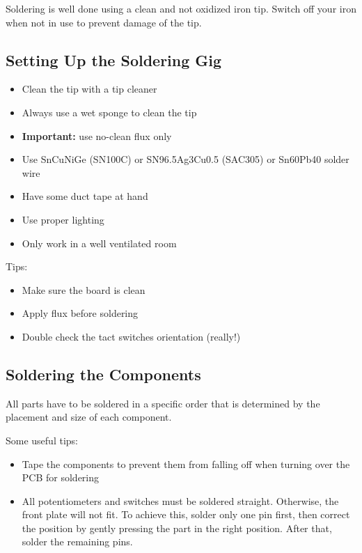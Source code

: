 \documentclass{scrartcl}
\begin{document}
Soldering is well done using a clean and not oxidized iron tip. Switch off your iron when not in use to prevent damage of the tip.

\subsection{Setting Up the Soldering Gig}

\begin{itemize}
    \item Clean the tip with a tip cleaner
    \item Always use a wet sponge to clean the tip
    \item \textbf{Important:} use no-clean flux only
    \item Use SnCuNiGe (SN100C) or SN96.5Ag3Cu0.5 (SAC305) or Sn60Pb40 solder wire
    \item Have some duct tape at hand
    \item Use proper lighting
    \item Only work in a well ventilated room
\end{itemize}

Tips:

\begin{itemize}
    \item Make sure the board is clean
    \item Apply flux before soldering
    \item Double check the tact switches orientation (really!)
\end{itemize}

\subsection{Soldering the Components}

All parts have to be soldered in a specific order that is determined by the placement and size of each component.

Some useful tips:

\begin{itemize}
    \item Tape the components to prevent them from falling off when turning over the PCB for soldering
    \item All potentiometers and switches must be soldered straight. Otherwise, the front plate will not fit. To achieve this, solder only one pin first, then correct the position by gently pressing the part in the right position. After that, solder the remaining pins.
\end{itemize}
\end{document}
